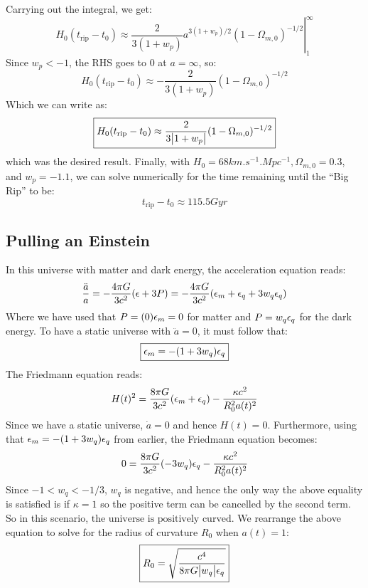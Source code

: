 Carrying out the integral, we get:
\begin{equation}
    H_0(t_{\text{rip}} - t_0) \approx \left. \frac{2}{3(1+w_p)}a^{3(1+w_p)/2}(1 - \Omega_{m, 0})^{-1/2}\right|_{1}^\infty
\end{equation}
Since $w_p < -1$, the RHS goes to $0$ at $a = \infty$, so:
\begin{equation}
    H_0(t_{\text{rip}} - t_0) \approx -\frac{2}{3(1+w_p)}(1 - \Omega_{m, 0})^{-1/2}
\end{equation}
Which we can write as:
\begin{equation}
    \boxed{H_0(t_{\text{rip}} - t_0) \approx \frac{2}{3\abs{1+w_p}}(1 - \Omega_{m, 0})^{-1/2}}
\end{equation}
which was the desired result. Finally, with $H_0 = 68\si{km.s^{-1}.Mpc^{-1}}, \Omega_{m, 0} = 0.3$, and $w_p = -1.1$, we can solve numerically for the time remaining until the ``Big Rip'' to be:
\begin{equation}
    \boxed{t_{\text{rip}} - t_0 \approx 115.5 \si{Gyr}}
\end{equation}

\subsection{Pulling an Einstein}
In this universe with matter and dark energy, the acceleration equation reads:
\begin{equation}
    \frac{\ddot{a}}{a} = -\frac{4\pi G}{3c^2}(\epsilon + 3P) = -\frac{4\pi G}{3c^2}(\epsilon_m + \epsilon_q + 3w_q \epsilon_q)
\end{equation}
Where we have used that $P = (0)\epsilon_m = 0$ for matter and $P = w_q\epsilon_q$ for the dark energy. To have a static universe with $\ddot{a} = 0$, it must follow that:
\begin{equation}
    \boxed{\epsilon_m = -(1 + 3w_q)\epsilon_q}
\end{equation}
The Friedmann equation reads:
\begin{equation}
    H(t)^2 = \frac{8\pi G}{3c^2}(\epsilon_m + \epsilon_q) - \frac{\kappa c^2}{R_0^2a(t)^2}
\end{equation}
Since we have a static universe, $\dot{a} = 0$ and hence $H(t) = 0$. Furthermore, using that $\epsilon_m = -(1 + 3w_q)\epsilon_q$ from earlier, the Friedmann equation becomes:
\begin{equation}
    0 = \frac{8\pi G}{3c^2}(-3w_q)\epsilon_q - \frac{\kappa c^2}{R_0^2a(t)^2}
\end{equation}
Since $-1 < w_q < -1/3$, $w_q$ is negative, and hence the only way the above equality is satisfied is if $\kappa = 1$ so the positive term can be cancelled by the second term. So in this scenario, $\boxed{\text{the universe is positively curved}}$. We rearrange the above equation to solve for the radius of curvature $R_0$ when $a(t) = 1$:
\begin{equation}
    \boxed{R_0 = \sqrt{\frac{c^4}{8\pi G \abs{w_q} \epsilon_q}}}
\end{equation}

